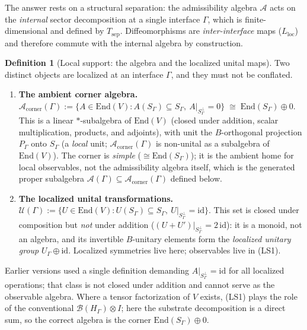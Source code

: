 \documentclass[11pt]{article}
\theoremstyle{definition}
\newtheorem{definition}[theorem]{Definition}
\begin{document}
The answer rests on a structural separation: the admissibility algebra
$\mathcal{A}$ acts on the \emph{internal} sector decomposition at a
single interface $\Gamma$, which is finite-dimensional and defined by
$T_{\mathrm{sep}}$.  Diffeomorphisms are \emph{inter-interface} maps
($L_{\mathrm{loc}}$) and therefore commute with the internal algebra
by construction.

\begin{definition}[Local support: the algebra and the localized unital maps]\label{def:local_support}
Two distinct objects are localized at an interface $\Gamma$, and they
must not be conflated.
\begin{enumerate}[label=(LS\arabic*),nosep]
  \item \textbf{The ambient corner algebra.}
  $\mathcal{A}_{\mathrm{corner}}(\Gamma) := \{A \in \mathrm{End}(V) :
  A(S_\Gamma) \subseteq S_\Gamma,\ A|_{S_\Gamma^\perp} = 0\}
  \;\cong\; \mathrm{End}(S_\Gamma) \oplus 0$.
  This is a linear $*$-subalgebra of $\mathrm{End}(V)$ (closed under
  addition, scalar multiplication, products, and adjoints), with unit
  the $B$-orthogonal projection $P_\Gamma$ onto $S_\Gamma$ (a
  \emph{local} unit; $\mathcal{A}_{\mathrm{corner}}(\Gamma)$ is
  non-unital as a subalgebra of $\mathrm{End}(V)$).  The corner is
  \emph{simple} ($\cong \mathrm{End}(S_\Gamma)$); it is the ambient
  home for local observables, not the admissibility algebra itself,
  which is the generated proper subalgebra
  $\mathcal{A}(\Gamma) \subseteq \mathcal{A}_{\mathrm{corner}}(\Gamma)$
  defined below.
  \item \textbf{The localized unital transformations.}
  $\mathcal{U}(\Gamma) := \{U \in \mathrm{End}(V) :
  U(S_\Gamma) \subseteq S_\Gamma,\ U|_{S_\Gamma^\perp} = \mathrm{id}\}$.
  This set is closed under composition but \emph{not} under addition
  ($(U + U')|_{S_\Gamma^\perp} = 2\,\mathrm{id}$): it is a monoid, not
  an algebra, and its invertible $B$-unitary elements form the
  \emph{localized unitary group} $U_\Gamma \oplus \mathrm{id}$.
  Localized symmetries live here; observables live in (LS1).
\end{enumerate}
Earlier versions used a single definition demanding
$A|_{S_\Gamma^\perp} = \mathrm{id}$ for all localized operations; that
class is not closed under addition and cannot serve as the observable
algebra.  Where a tensor factorization of $V$ exists, (LS1) plays the
role of the conventional $\mathcal{B}(H_\Gamma) \otimes I$; here the
substrate decomposition is a direct sum, so the correct algebra is the
corner $\mathrm{End}(S_\Gamma) \oplus 0$.
\end{definition}
\end{document}
